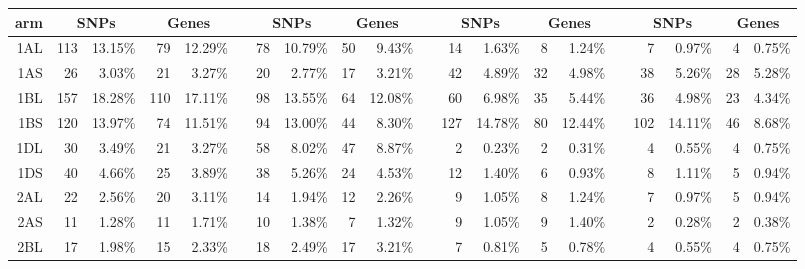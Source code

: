 \begin{sidewaystable}
\begin{localsize}{6}{9}
\begin{tabular}{rrrrrrrrrrrrrrrrrrrr}
 \cline{2-5}
 \cline{7-10}
  \cline{12-15}
 \cline{17-20}
  arm & 
 \multicolumn{2}{c}{SNPs } & 
 \multicolumn{2}{c}{Genes } &  &
 \multicolumn{2}{c}{SNPs } & 
 \multicolumn{2}{c}{Genes } &     &  
 \multicolumn{2}{c}{SNPs } & 
 \multicolumn{2}{c}{Genes } & &
 \multicolumn{2}{c}{SNPs } & 
 \multicolumn{2}{c}{Genes }      
 \\
 \midrule
 1AL            & 113                   & 13.15\% & 79    & 12.29\% &    & 78          & 10.79\% & 50    & 9.43\%  &    & 14                     & 1.63\%  & 8     & 1.24\%  &    & 7           & 0.97\%  & 4     & 0.75\%  \\
 1AS            & 26                    & 3.03\%  & 21    & 3.27\%  &    & 20          & 2.77\%  & 17    & 3.21\%  &    & 42                     & 4.89\%  & 32    & 4.98\%  &    & 38          & 5.26\%  & 28    & 5.28\%  \\
 1BL            & 157                   & 18.28\% & 110   & 17.11\% &    & 98          & 13.55\% & 64    & 12.08\% &    & 60                     & 6.98\%  & 35    & 5.44\%  &    & 36          & 4.98\%  & 23    & 4.34\%  \\
 1BS            & 120                   & 13.97\% & 74    & 11.51\% &    & 94          & 13.00\% & 44    & 8.30\%  &    & 127                    & 14.78\% & 80    & 12.44\% &    & 102         & 14.11\% & 46    & 8.68\%  \\
 1DL            & 30                    & 3.49\%  & 21    & 3.27\%  &    & 58          & 8.02\%  & 47    & 8.87\%  &    & 2                      & 0.23\%  & 2     & 0.31\%  &    & 4           & 0.55\%  & 4     & 0.75\%  \\
 1DS            & 40                    & 4.66\%  & 25    & 3.89\%  &    & 38          & 5.26\%  & 24    & 4.53\%  &    & 12                     & 1.40\%  & 6     & 0.93\%  &    & 8           & 1.11\%  & 5     & 0.94\%  \\
  \midrule
 2AL            & 22                    & 2.56\%  & 20    & 3.11\%  &    & 14          & 1.94\%  & 12    & 2.26\%  &    & 9                      & 1.05\%  & 8     & 1.24\%  &    & 7           & 0.97\%  & 5     & 0.94\%  \\
 2AS            & 11                    & 1.28\%  & 11    & 1.71\%  &    & 10          & 1.38\%  & 7     & 1.32\%  &    & 9                      & 1.05\%  & 9     & 1.40\%  &    & 2           & 0.28\%  & 2     & 0.38\%  \\
 2BL            & 17                    & 1.98\%  & 15    & 2.33\%  &    & 18          & 2.49\%  & 17    & 3.21\%  &    & 7                      & 0.81\%  & 5     & 0.78\%  &    & 4           & 0.55\%  & 4     & 0.75\%  \\

\end{tabular}
\end{localsize}
\end{sidewaystable}
